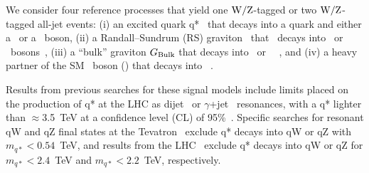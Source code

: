 We consider four reference processes that yield one ${\rm W}/{\rm Z}$-tagged
or two ${\rm W}/{\rm Z}$-tagged all-jet events: (i) an excited quark
q*~\cite{ref_qstar, ref_qstar2} that decays into a quark and
either a \PW\ or a \cPZ\ boson, (ii) a Randall--Sundrum (RS) graviton
\GRS~that~ decays into \PW \PW\ or \cPZ \cPZ\
bosons~\cite{rs1,Randall:1999vf}, (iii) a ``bulk'' graviton $G_\mathrm{Bulk}$
that decays into \PW \PW\ or \cPZ \cPZ\
~\cite{GravitonWWZZ1,GravitonWWZZ2,GravitonWWZZ3}, and (iv) a
heavy partner of the SM \PW\ boson (\PWpr) that decays into \PW\cPZ\
\cite{egm}.






Results from previous searches for these signal models include limits
placed on the production of q* at the LHC as
dijet~\cite{exo12016,ATLASexcitedPAS,Harris:2011bh} or
$\gamma$+jet~\cite{Aad:2013cva} resonances, with a q* lighter
than $\approx$3.5~TeV at a confidence level (CL) of
95\%~\cite{exo12016}. Specific searches for resonant qW and
qZ final states at the
Tevatron~\cite{CDFexcitedPAPER,D0excitedPAPER} exclude q* decays
into qW or qZ with $m_{q*}<0.54$~TeV, and results
from the LHC~\cite{ref_2011,CMSqZPAS} exclude q* decays into
qW or qZ for $m_{q*}< 2.4$~TeV and $m_{q*}<
2.2$~TeV, respectively.


